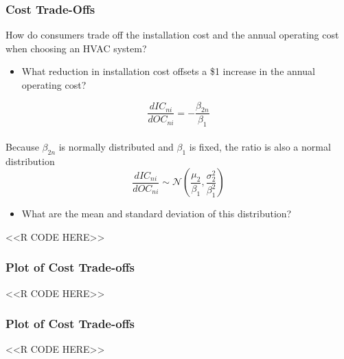 \documentclass{beamer}
\begin{document}
\begin{frame}[fragile]\frametitle{Cost Trade-Offs}
    How do consumers trade off the installation cost and the annual operating cost when choosing an HVAC system?
    \begin{itemize}
        \item What reduction in installation cost offsets a \$1 increase in the annual operating cost?
    \end{itemize}
    $$\frac{dIC_{ni}}{dOC_{ni}} = -\frac{\beta_{2n}}{\beta_1}$$ \\
    Because $\beta_{2n}$ is normally distributed and  $\beta_1$ is fixed, the ratio is also a normal distribution
    $$\frac{dIC_{ni}}{dOC_{ni}} \sim \mathcal{N} \left( \frac{\mu_2}{\beta_1}, \frac{\sigma_2^2}{\beta_1^2} \right)$$
    \begin{itemize}
    	\item What are the mean and standard deviation of this distribution?
    \end{itemize}
    <<R CODE HERE>>
\end{frame}

\begin{frame}[fragile]\frametitle{Plot of Cost Trade-offs}
    <<R CODE HERE>>
\end{frame}

\begin{frame}[fragile]\frametitle{Plot of Cost Trade-offs}
    <<R CODE HERE>>
\end{frame}
\end{document}
